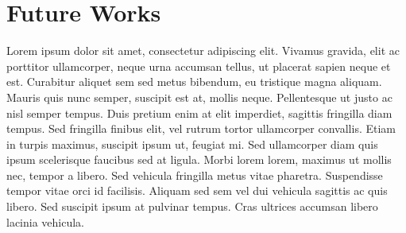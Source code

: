 \section{Future Works}
Lorem ipsum dolor sit amet, consectetur adipiscing elit. Vivamus gravida, elit ac porttitor ullamcorper, neque urna accumsan tellus, ut placerat sapien neque et est. Curabitur aliquet sem sed metus bibendum, eu tristique magna aliquam. Mauris quis nunc semper, suscipit est at, mollis neque. Pellentesque ut justo ac nisl semper tempus. Duis pretium enim at elit imperdiet, sagittis fringilla diam tempus. Sed fringilla finibus elit, vel rutrum tortor ullamcorper convallis. Etiam in turpis maximus, suscipit ipsum ut, feugiat mi. Sed ullamcorper diam quis ipsum scelerisque faucibus sed at ligula. Morbi lorem lorem, maximus ut mollis nec, tempor a libero. Sed vehicula fringilla metus vitae pharetra. Suspendisse tempor vitae orci id facilisis. Aliquam sed sem vel dui vehicula sagittis ac quis libero. Sed suscipit ipsum at pulvinar tempus. Cras ultrices accumsan libero lacinia vehicula.